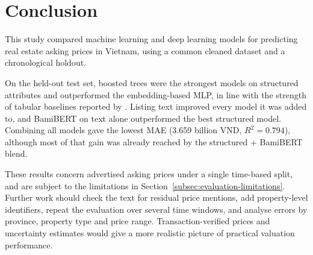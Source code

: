 \section{Conclusion}
\label{sec:conclusion}

This study compared machine learning and deep learning models for predicting real estate asking prices in Vietnam, using a common cleaned dataset and a chronological holdout.

On the held-out test set, boosted trees were the strongest models on structured attributes and outperformed the embedding-based MLP, in line with the strength of tabular baselines reported by \textcite{gorishniy2021revisiting}. Listing text improved every model it was added to, and BamiBERT on text alone outperformed the best structured model. Combining all models gave the lowest MAE (3.659 billion VND, $R^2=0.794$), although most of that gain was already reached by the structured + BamiBERT blend.

These results concern advertised asking prices under a single time-based split, and are subject to the limitations in Section~\ref{subsec:evaluation-limitations}. Further work should check the text for residual price mentions, add property-level identifiers, repeat the evaluation over several time windows, and analyse errors by province, property type and price range. Transaction-verified prices and uncertainty estimates would give a more realistic picture of practical valuation performance.
